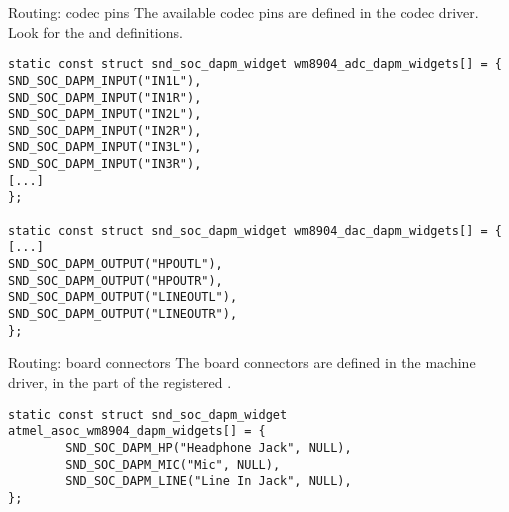 \begin{frame}[fragile]{Routing: codec pins}
  The available codec pins are defined in the codec driver. Look for
  the  and 
  definitions.

  \begin{block}{}
    \fontsize{8}{8}\selectfont
    \begin{verbatim}
static const struct snd_soc_dapm_widget wm8904_adc_dapm_widgets[] = {
SND_SOC_DAPM_INPUT("IN1L"),
SND_SOC_DAPM_INPUT("IN1R"),
SND_SOC_DAPM_INPUT("IN2L"),
SND_SOC_DAPM_INPUT("IN2R"),
SND_SOC_DAPM_INPUT("IN3L"),
SND_SOC_DAPM_INPUT("IN3R"),
[...]
};

static const struct snd_soc_dapm_widget wm8904_dac_dapm_widgets[] = {
[...]
SND_SOC_DAPM_OUTPUT("HPOUTL"),
SND_SOC_DAPM_OUTPUT("HPOUTR"),
SND_SOC_DAPM_OUTPUT("LINEOUTL"),
SND_SOC_DAPM_OUTPUT("LINEOUTR"),
};
    \end{verbatim}
  \end{block}
\end{frame}

\begin{frame}[fragile]{Routing: board connectors}
  The board connectors are defined in the machine driver, in the
   part of the registered
  .
  \begin{block}{}
    \fontsize{10}{10}\selectfont
    \begin{verbatim}
static const struct snd_soc_dapm_widget atmel_asoc_wm8904_dapm_widgets[] = {
        SND_SOC_DAPM_HP("Headphone Jack", NULL),
        SND_SOC_DAPM_MIC("Mic", NULL),
        SND_SOC_DAPM_LINE("Line In Jack", NULL),
};
    \end{verbatim}
  \end{block}
\end{frame}

